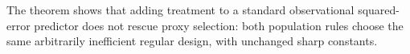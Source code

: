 The theorem shows that adding treatment to a standard observational squared-error predictor does not rescue proxy selection: both population rules choose the same arbitrarily inefficient regular design, with unchanged sharp constants.
